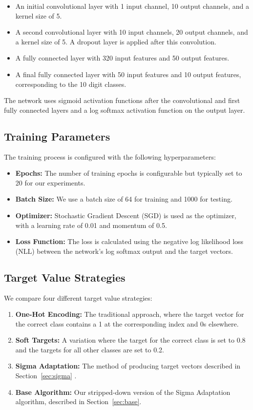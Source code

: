 \documentclass[12pt,fleqn,a4paper]{article}
\begin{document}
 \begin{itemize}
     \item An initial convolutional layer with 1 input channel, 10 output channels, and a kernel size of 5.
     \item A second convolutional layer with 10 input channels, 20 output channels, and a kernel size of 5. A dropout layer is applied after this convolution.
     \item A fully connected layer with 320 input features and 50 output features.
     \item A final fully connected layer with 50 input features and 10 output features, corresponding to the 10 digit classes.
 \end{itemize}
 The network uses sigmoid activation functions after the convolutional and first fully connected layers and a log softmax activation function on the output layer.

 \subsection{Training Parameters}
 The training process is configured with the following hyperparameters:
 \begin{itemize}
     \item \textbf{Epochs:} The number of training epochs is configurable but typically set to 20 for our experiments.
     \item \textbf{Batch Size:} We use a batch size of 64 for training and 1000 for testing.
     \item \textbf{Optimizer:} Stochastic Gradient Descent (SGD) is used as the optimizer, with a learning rate of 0.01 and momentum of 0.5.
     \item \textbf{Loss Function:} The loss is calculated using the negative log likelihood loss (NLL) between the network's log softmax output and the target vectors.
 \end{itemize}

 \subsection{Target Value Strategies}
 We compare four different target value strategies:
 \begin{enumerate}
     \item \textbf{One-Hot Encoding:} The traditional approach, where the target vector for the correct class contains a 1 at the corresponding index and 0s elsewhere.
     \item \textbf{Soft Targets:} A variation where the target for the correct class is set to 0.8 and the targets for all other classes are set to 0.2.
     \item \textbf{Sigma Adaptation:} The method of producing target vectors described in Section~\ref{sec:sigma} \cite{begic}.
     \item \textbf{Base Algorithm:} Our stripped-down version of the Sigma Adaptation algorithm, described in Section~\ref{sec:base}.
 \end{enumerate}
\end{document}

